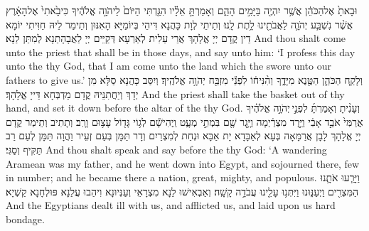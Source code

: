 {וּבָאתָ֙ אֶל\maqqaf הַכֹּהֵ֔ן אֲשֶׁ֥ר יִהְיֶ֖ה בַּיָּמִ֣ים הָהֵ֑ם וְאָמַרְתָּ֣ אֵלָ֗יו הִגַּ֤דְתִּי הַיּוֹם֙ לַיהֹוָ֣ה אֱלֹהֶ֔יךָ כִּי\maqqaf בָ֙אתִי֙ אֶל\maqqaf הָאָ֔רֶץ אֲשֶׁ֨ר נִשְׁבַּ֧ע יְהֹוָ֛ה לַאֲבֹתֵ֖ינוּ לָ֥תֶת לָֽנוּ׃}
{וְתֵיתֵי לְוָת כָּהֲנָא דִּיהֵי בְּיוֹמַיָּא הָאִנּוּן וְתֵימַר לֵיהּ חַוִּיתִי יוֹמָא דֵין קֳדָם יְיָ אֱלָהָךְ אֲרֵי עַלִית לְאַרְעָא דְּקַיֵּים יְיָ לַאֲבָהָתַנָא לְמִתַּן לַנָא׃}
{And thou shalt come unto the priest that shall be in those days, and say unto him: ‘I profess this day unto the \lord\space thy God, that I am come unto the land which the \lord\space swore unto our fathers to give us.’}{}
{וְלָקַ֧ח הַכֹּהֵ֛ן הַטֶּ֖נֶא מִיָּדֶ֑ךָ וְהִ֨נִּיח֔וֹ לִפְנֵ֕י מִזְבַּ֖ח יְהֹוָ֥ה אֱלֹהֶֽיךָ׃}
{וְיִסַּב כָּהֲנָא סַלָּא מִן יְדָךְ וְיַחֲתִנֵּיהּ קֳדָם מַדְבְּחָא דַּייָ אֱלָהָךְ׃}
{And the priest shall take the basket out of thy hand, and set it down before the altar of the \lord\space thy God.}{}
{וְעָנִ֨יתָ וְאָמַרְתָּ֜ לִפְנֵ֣י \legarmeh  יְהֹוָ֣ה אֱלֹהֶ֗יךָ אֲרַמִּי֙ אֹבֵ֣ד אָבִ֔י וַיֵּ֣רֶד מִצְרַ֔יְמָה וַיָּ֥גׇר שָׁ֖ם בִּמְתֵ֣י מְעָ֑ט וַֽיְהִי\maqqaf שָׁ֕ם לְג֥וֹי גָּד֖וֹל עָצ֥וּם וָרָֽב׃}
{וְתָתִיב וְתֵימַר קֳדָם יְיָ אֱלָהָךְ לָבָן אֲרַמָּאָה בְּעָא לְאַבָּדָא יָת אַבָּא וּנְחַת לְמִצְרַיִם וְדָר תַּמָּן בְּעַם זְעֵיר וַהֲוָה תַּמָּן לְעַם רַב תַּקִּיף וְסַגִּי׃}
{And thou shalt speak and say before the \lord\space thy God: ‘A wandering Aramean was my father, and he went down into Egypt, and sojourned there, few in number; and he became there a nation, great, mighty, and populous.}{}
{וַיָּרֵ֧עוּ אֹתָ֛נוּ הַמִּצְרִ֖ים וַיְעַנּ֑וּנוּ וַיִּתְּנ֥וּ עָלֵ֖ינוּ עֲבֹדָ֥ה קָשָֽׁה׃}
{וְאַבְאִישׁוּ לַנָא מִצְרָאֵי וְעַנְּיוּנָא וִיהַבוּ עֲלַנָא פּוּלְחָנָא קַשְׁיָא׃}
{And the Egyptians dealt ill with us, and afflicted us, and laid upon us hard bondage.}{}
